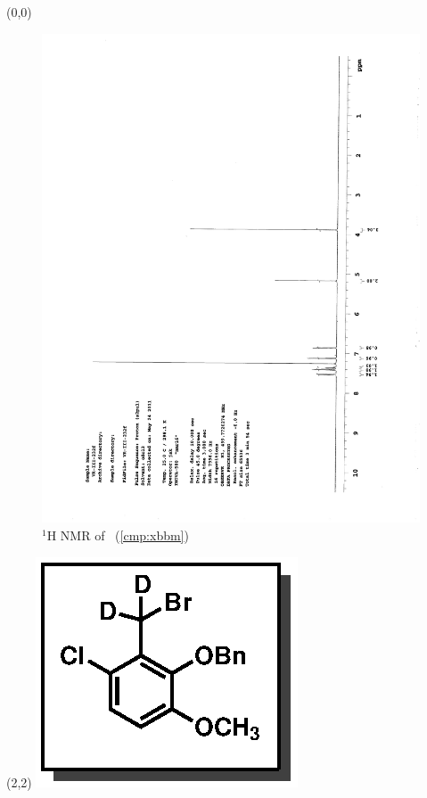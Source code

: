 \begin{textblock}{20}(0,0)
\begin{figure}[htb]
\caption{$^1$H NMR of \CMPxbbm\ (\ref{cmp:xbbm})}
\includegraphics[scale=0.75, trim = 0mm 0mm 0mm 5mm,
clip]{chp_singlecarbon/images/nmr/xbbmH}
\vspace{-100pt}
\end{figure}
\end{textblock}
\begin{textblock}{1}(2,2)
\includegraphics[scale=0.8, angle=90]{chp_singlecarbon/images/xbbm}
\end{textblock}
